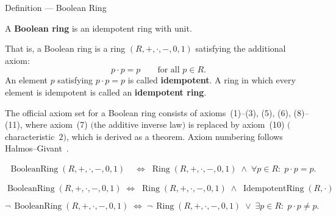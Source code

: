 

\begin{definitionbox}{Definition --- Boolean Ring}
\begin{definition}
\label{def:boolean-ring}
A \textbf{Boolean ring} is an idempotent ring with unit.

That is, a Boolean ring is a ring $(R, +, \cdot, -, 0, 1)$
satisfying the additional axiom:
\[
p \cdot p = p \qquad \text{for all } p \in R. \tag{11}
\]
An element $p$ satisfying $p \cdot p = p$ is called
\textbf{idempotent}.
A ring in which every element is idempotent is called an
\textbf{idempotent ring}.

The official axiom set for a Boolean ring consists of
axioms~(1)--(3), (5), (6), (8)--(11), where axiom~(7)
$($the additive inverse law$)$ is replaced by
axiom~(10) $($characteristic~$2)$, which is derived as a theorem.
Axiom numbering follows Halmos--Givant~\cite{HalmosGivant2009}.
\end{definition}
\end{definitionbox}

\begin{remark*}
\[
\begin{aligned}
\operatorname{BooleanRing}(R,+,\cdot,-,0,1)
&\;\Longleftrightarrow\;
  \operatorname{Ring}(R,+,\cdot,-,0,1)
  \;\land\;
  \forall p \in R{:}\; p \cdot p = p.
\end{aligned}
\]
\end{remark*}

\begin{remark*}
\[
\operatorname{BooleanRing}(R,+,\cdot,-,0,1)
\;\Longleftrightarrow\;
\operatorname{Ring}(R,+,\cdot,-,0,1)
\;\land\;
\operatorname{IdempotentRing}(R,\cdot)
\]
\end{remark*}

\begin{remark*}
\[
\neg\,\operatorname{BooleanRing}(R,+,\cdot,-,0,1)
\;\Longleftrightarrow\;
\neg\,\operatorname{Ring}(R,+,\cdot,-,0,1)
\;\lor\;
\exists p \in R{:}\; p \cdot p \neq p.
\]
\end{remark*}


